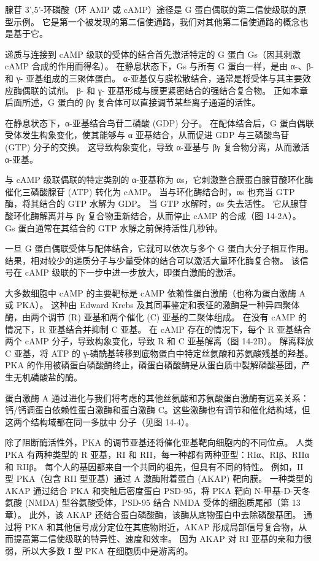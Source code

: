 腺苷 3',5'-环磷酸（环 AMP 或 cAMP）途径是 G 蛋白偶联的第二信使级联的原型示例。 它是第一个被发现的第二信使通路，我们对其他第二信使通路的概念也是基于它。

递质与连接到 cAMP 级联的受体的结合首先激活特定的 G 蛋白 Gs（因其刺激 cAMP 合成的作用而得名）。 在静息状态下，Gs 与所有 G 蛋白一样，是由 α-、β- 和 γ- 亚基组成的三聚体蛋白。 α-亚基仅与膜松散结合，通常是将受体与其主要效应酶偶联的试剂。 β- 和 γ- 亚基形成与膜更紧密结合的强结合复合物。 正如本章后面所述，G 蛋白的 βγ 复合体可以直接调节某些离子通道的活性。

在静息状态下，α-亚基结合鸟苷二磷酸 (GDP) 分子。 在配体结合后，G 蛋白偶联受体发生构象变化，使其能够与 α 亚基结合，从而促进 GDP 与三磷酸鸟苷 (GTP) 分子的交换。 这导致构象变化，导致 α-亚基与 βγ 复合物分离，从而激活 α-亚基。

与 cAMP 级联偶联的特定类别的 α-亚基称为 αs，它刺激整合膜蛋白腺苷酸环化酶催化三磷酸腺苷 (ATP) 转化为 cAMP。 当与环化酶结合时，αs 也充当 GTP 酶，将其结合的 GTP 水解为 GDP。 当 GTP 水解时，αs 失去活性。 它从腺苷酸环化酶解离并与 βγ 复合物重新结合，从而停止 cAMP 的合成（图 14-2A）。 Gs 蛋白通常在其结合的 GTP 水解之前保持活性几秒钟。

一旦 G 蛋白偶联受体与配体结合，它就可以依次与多个 G 蛋白大分子相互作用。 结果，相对较少的递质分子与少量受体的结合可以激活大量环化酶复合物。 该信号在 cAMP 级联的下一步中进一步放大，即蛋白激酶的激活。

大多数细胞中 cAMP 的主要靶标是 cAMP 依赖性蛋白激酶（也称为蛋白激酶 A 或 PKA）。 这种由 Edward Krebs 及其同事鉴定和表征的激酶是一种异四聚体酶，由两个调节 (R) 亚基和两个催化 (C) 亚基的二聚体组成。 在没有 cAMP 的情况下，R 亚基结合并抑制 C 亚基。 在 cAMP 存在的情况下，每个 R 亚基结合两个 cAMP 分子，导致构象变化，导致 R 和 C 亚基解离（图 14-2B）。 解离释放 C 亚基，将 ATP 的 γ-磷酰基转移到底物蛋白中特定丝氨酸和苏氨酸残基的羟基。 PKA 的作用被磷蛋白磷酸酶终止，磷蛋白磷酸酶是从蛋白质中裂解磷酸基团，产生无机磷酸盐的酶。

蛋白激酶 A 通过进化与我们将考虑的其他丝氨酸和苏氨酸蛋白激酶有远亲关系：钙/钙调蛋白依赖性蛋白激酶和蛋白激酶 C。这些激酶也有调节和催化结构域，但这两个结构域都在同一多肽中 分子（见图 14-4）。

除了阻断酶活性外，PKA 的调节亚基还将催化亚基靶向细胞内的不同位点。 人类 PKA 有两种类型的 R 亚基，RI 和 RII，每一种都有两种亚型：RIα、RIβ、RIIα 和 RIIβ。 每个人的基因都来自一个共同的祖先，但具有不同的特性。 例如，II 型 PKA（包含 RII 型亚基）通过 A 激酶附着蛋白 (AKAP) 靶向膜。 一种类型的 AKAP 通过结合 PKA 和突触后密度蛋白 PSD-95，将 PKA 靶向 N-甲基-D-天冬氨酸 (NMDA) 型谷氨酸受体，PSD-95 结合 NMDA 受体的细胞质尾部（第 13 章）。 此外，该 AKAP 还结合蛋白磷酸酶，该酶从底物蛋白中去除磷酸基团。 通过将 PKA 和其他信号成分定位在其底物附近，AKAP 形成局部信号复合物，从而提高第二信使级联的特异性、速度和效率。 因为 AKAP 对 RI 亚基的亲和力很弱，所以大多数 I 型 PKA 在细胞质中是游离的。

